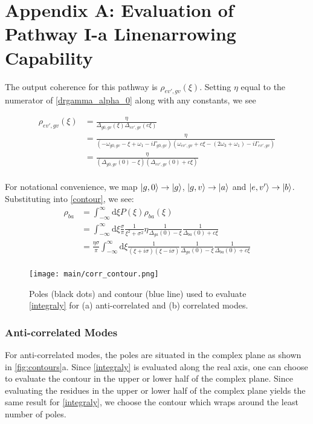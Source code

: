 \documentclass[aip, jcp, reprint, onecolumn]{revtex4-2}
\begin{document}
\section{Appendix A: Evaluation of Pathway I-a Linenarrowing Capability}
The output coherence  for this pathway is $\rho_{ev',gv}(\xi)$.
Setting $\eta$ equal to the numerator of \autoref{drgamma_alpha_0} along with any constants, we see
\begin{widetext}
\begin{equation}\label{ev'gv}
	\begin{split}
		\rho_{ev',gv}(\xi) &= \frac{\eta}{\Delta_{g0,gv}(\xi) \Delta_{ev',gv}(c\xi)}\\
		&=  \frac{\eta}{(-\omega_{g0,gv} - \xi + \omega_1 - i\Gamma_{g0,gv})(\omega_{ev',gv} + c\xi - (2\omega_3 + \omega_1) - i\Gamma_{ev',gv})}\\ 
		&= \frac{\eta}{(\Delta_{g0,gv}(0) - \xi)(\Delta_{ev',gv}(0) + c\xi)}\\ 
	\end{split}
\end{equation}
\end{widetext}
For notational convenience, we map $\ket{g,0} \rightarrow \ket{g}$, $\ket{g,v} \rightarrow \ket{a}$ and $\ket{e,v'} \rightarrow \ket{b}$.
Substituting into \autoref{contour}, we see:
\begin{equation}\label{integraly}
	\begin{split}
		\rho_{ba} &= \int_{-\infty}^\infty \mathrm{d}\xi P(\xi) \rho_{ba}(\xi)\\
		&= \int_{-\infty}^\infty \mathrm{d}\xi \frac{\sigma}{\pi} \frac{1}{\xi^2 + \sigma^2} \eta \frac{1}{\Delta_{ga}(0) - \xi} \frac{1}{\Delta_{ba}(0) + c\xi}\\
		&= \frac{\eta \sigma}{\pi} \int_{-\infty}^\infty \mathrm{d}\xi\frac{1}{(\xi + i\sigma)(\xi - i\sigma)} \frac{1}{\Delta_{ga}(0) - \xi} \frac{1}{\Delta_{ba}(0) + c\xi}\\
	\end{split}
\end{equation}

\begin{figure}[!htbp]
	\centering
	\texttt{[image: main/corr\_contour.png]}
	\caption{Poles (black dots) and contour (blue line) used to evaluate \autoref{integraly} for (a) anti-correlated and (b) correlated modes.} 
	\label{fig:contours}
\end{figure}

\subsubsection{Anti-correlated Modes}
For anti-correlated modes, the poles are situated in the complex plane as shown in \autoref{fig:contours}a.
Since \autoref{integraly} is evaluated along the real axis, one can choose to evaluate the contour in the upper or lower half of the complex plane.
Since evaluating the residues in the upper or lower half of the complex plane yields the same result for \autoref{integraly}, we choose the contour which wraps around the least number of poles.
\end{document}
